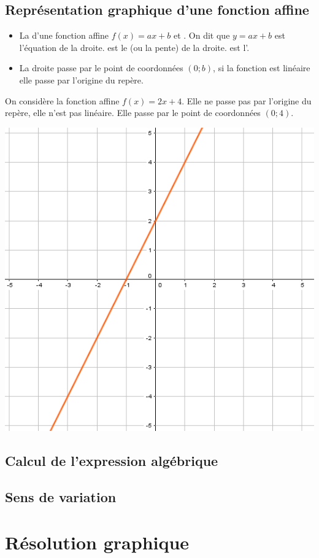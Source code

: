 \documentclass[12pt,a4paper]{article}
\begin{document}
\subsection{Représentation graphique d'une fonction affine}	

\begin{myprops}
	\begin{itemize}
		\item La  d'une fonction affine $f(x)=ax+b$ et . On dit que $y=ax+b$ est l'équation de la droite.
		 est le  (ou la pente) de la droite.
		 est l'.
		\item La droite passe par le point de coordonnées $(0;b)$, si la fonction est linéaire elle passe par l'origine du repère.
	\end{itemize}
	
\end{myprops}

\begin{myex}
	\begin{multicols}{2}
		\vspace*{1.5cm}
		On considère la fonction affine $f(x)=2x+4$. Elle ne passe pas par l'origine du repère, elle n'est pas linéaire. Elle passe par le point de coordonnées $(0;4)$.
		
		\includegraphics[scale=0.5]{img/ex1}
	\end{multicols}
\end{myex}

\subsection{Calcul de l'expression algébrique}
\subsection{Sens de variation}

\section{Résolution graphique}
\end{document}
